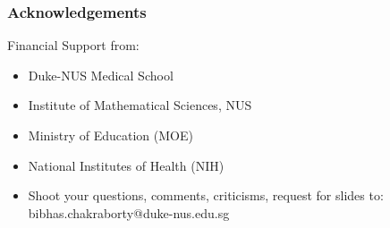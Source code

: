 \documentclass[10pt,xcolor=dvipsnames]{beamer}
\begin{document}
\begin{frame}
\frametitle{Acknowledgements}
\alert{Financial Support from:}
\bigskip
\begin{itemize}
\item Duke-NUS Medical School
\item Institute of Mathematical Sciences, NUS
\item Ministry of Education (MOE)
\item National Institutes of Health (NIH)
\end{itemize}
\end{frame}




\begin{frame}[plain]
\begin{itemize}
\item Shoot your questions, comments, criticisms, request for slides to: {\color{blue}bibhas.chakraborty@duke-nus.edu.sg}\bigskip
\bigskip
\begin{center}
\begin{figure}
\end{figure}
\end{center}
\end{itemize}
\end{frame}
\end{document}
